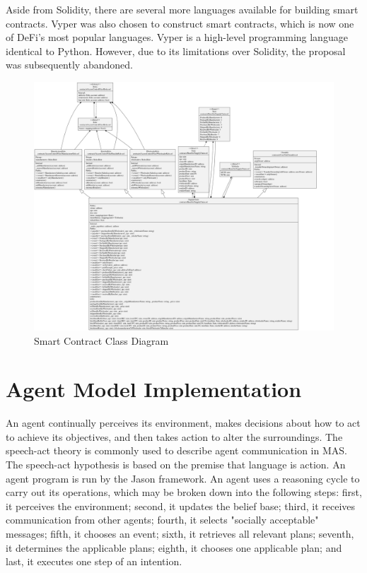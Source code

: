 \vspace{.5cm}

Aside from Solidity, there are several more languages available for building smart contracts. Vyper was also chosen to construct smart contracts, which is now one of \ac{DeFi}'s most popular languages. Vyper is a high-level programming language identical to Python. However, due to its limitations over Solidity, the proposal was subsequently abandoned.

\begin{figure}[h!]
\centering
  \includegraphics[width=21cm, angle=90]{includes/figures/OverallClassDiagram.png} 
  \caption{Smart Contract Class Diagram}
  \label{Overall Class Diagram}
\end{figure}

\section{Agent Model Implementation}

An agent continually perceives its environment, makes decisions about how to act to achieve its objectives, and then takes action to alter the surroundings. The speech-act theory is commonly used to describe agent communication in \ac{MAS}. The speech-act hypothesis is based on the premise that language is action. An agent program is run by the Jason framework. An agent uses a reasoning cycle to carry out its operations, which may be broken down into the following steps: first, it perceives the environment; second, it updates the belief base; third, it receives communication from other agents; fourth, it selects "socially acceptable" messages; fifth, it chooses an event; sixth, it retrieves all relevant plans; seventh, it determines the applicable plans; eighth, it chooses one applicable plan; and last, it executes one step of an intention.

